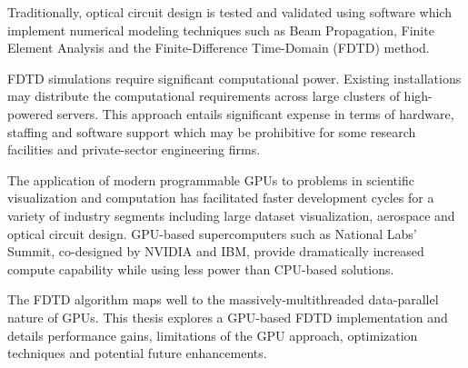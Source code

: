 Traditionally, optical circuit design is tested and validated using software which implement numerical modeling techniques such as Beam Propagation, Finite Element Analysis and the Finite-Difference Time-Domain (FDTD) method.

FDTD simulations require significant computational power. Existing installations may distribute the computational requirements across large clusters of high-powered servers. This approach entails significant expense in terms of hardware, staffing and software support which may be prohibitive for some research facilities and private-sector engineering firms.

The application of modern programmable GPUs to problems in scientific visualization and computation has facilitated faster development cycles for a variety of industry segments including large dataset visualization\cite{raycasting}, aerospace\cite{Strzodka2013381} and optical circuit design. GPU-based supercomputers such as National Labs' Summit\cite{nvidiaNationalLabs}, co-designed by NVIDIA and IBM, provide dramatically increased compute capability while using less power than CPU-based solutions. 

The FDTD algorithm maps well to the massively-multithreaded data-parallel nature of GPUs. This thesis explores a GPU-based FDTD implementation and details performance gains, limitations of the GPU approach, optimization techniques and potential future enhancements. 